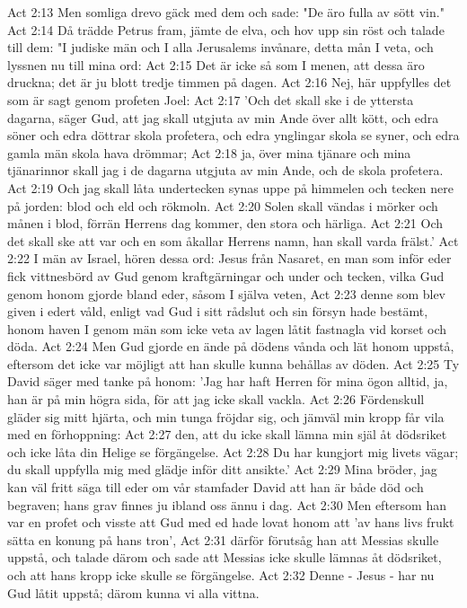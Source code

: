 Act 2:13  Men somliga drevo gäck med dem och sade: "De äro fulla av sött vin."
Act 2:14  Då trädde Petrus fram, jämte de elva, och hov upp sin röst och talade till dem: "I judiske män och I alla Jerusalems invånare, detta mån I veta, och lyssnen nu till mina ord:
Act 2:15  Det är icke så som I menen, att dessa äro druckna; det är ju blott tredje timmen på dagen.
Act 2:16  Nej, här uppfylles det som är sagt genom profeten Joel:
Act 2:17  'Och det skall ske i de yttersta dagarna, säger Gud, att jag skall utgjuta av min Ande över allt kött, och edra söner och edra döttrar skola profetera, och edra ynglingar skola se syner, och edra gamla män skola hava drömmar;
Act 2:18  ja, över mina tjänare och mina tjänarinnor skall jag i de dagarna utgjuta av min Ande, och de skola profetera.
Act 2:19  Och jag skall låta undertecken synas uppe på himmelen och tecken nere på jorden: blod och eld och rökmoln.
Act 2:20  Solen skall vändas i mörker och månen i blod, förrän Herrens dag kommer, den stora och härliga.
Act 2:21  Och det skall ske att var och en som åkallar Herrens namn, han skall varda frälst.'
Act 2:22  I män av Israel, hören dessa ord: Jesus från Nasaret, en man som inför eder fick vittnesbörd av Gud genom kraftgärningar och under och tecken, vilka Gud genom honom gjorde bland eder, såsom I själva veten,
Act 2:23  denne som blev given i edert våld, enligt vad Gud i sitt rådslut och sin försyn hade bestämt, honom haven I genom män som icke veta av lagen låtit fastnagla vid korset och döda.
Act 2:24  Men Gud gjorde en ände på dödens vånda och lät honom uppstå, eftersom det icke var möjligt att han skulle kunna behållas av döden.
Act 2:25  Ty David säger med tanke på honom: 'Jag har haft Herren för mina ögon alltid, ja, han är på min högra sida, för att jag icke skall vackla.
Act 2:26  Fördenskull gläder sig mitt hjärta, och min tunga fröjdar sig, och jämväl min kropp får vila med en förhoppning:
Act 2:27  den, att du icke skall lämna min själ åt dödsriket och icke låta din Helige se förgängelse.
Act 2:28  Du har kungjort mig livets vägar; du skall uppfylla mig med glädje inför ditt ansikte.'
Act 2:29  Mina bröder, jag kan väl fritt säga till eder om vår stamfader David att han är både död och begraven; hans grav finnes ju ibland oss ännu i dag.
Act 2:30  Men eftersom han var en profet och visste att Gud med ed hade lovat honom att 'av hans livs frukt sätta en konung på hans tron',
Act 2:31  därför förutsåg han att Messias skulle uppstå, och talade därom och sade att Messias icke skulle lämnas åt dödsriket, och att hans kropp icke skulle se förgängelse.
Act 2:32  Denne - Jesus - har nu Gud låtit uppstå; därom kunna vi alla vittna.

